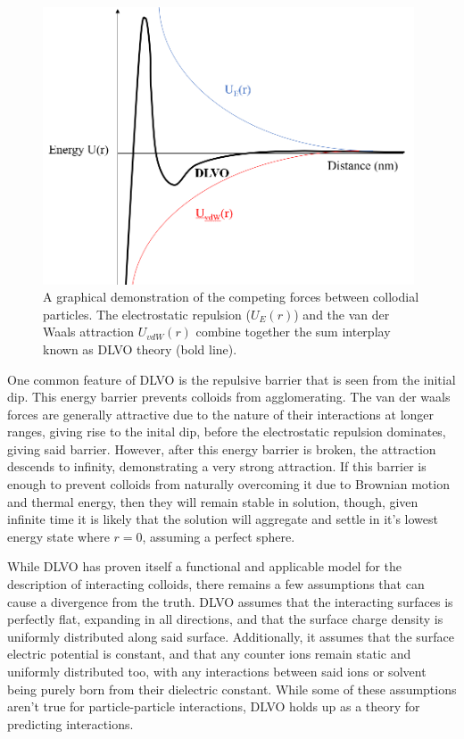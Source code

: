 \begin{figure}[h]     %
        \begin{center}
          \includegraphics[width=110mm]{chapter1/DLVO.PNG}
\end{center}
\caption{A graphical demonstration of the competing forces between collodial particles. The electrostatic repulsion ($U_E(r)$) and the van der Waals attraction $U_{vdW}(r)$ combine together the sum interplay known as DLVO theory (bold line).}
\label{fig:DLVO}                 %
\end{figure}

One common feature of DLVO is the repulsive barrier that is seen from the initial dip. This energy barrier prevents colloids from agglomerating. The van der waals forces are generally attractive due to the nature of their interactions at longer ranges, giving rise to the inital dip, before the electrostatic repulsion dominates, giving said barrier. However, after this energy barrier is broken, the attraction descends to infinity, demonstrating a very strong attraction. If this barrier is enough to prevent colloids from naturally overcoming it due to Brownian motion and thermal energy, then they will remain stable in solution, though, given infinite time it is likely that the solution will aggregate and settle in it's lowest energy state where $r = 0$, assuming a perfect sphere.\cite{?}

While DLVO has proven itself a functional and applicable model for the description of interacting colloids, there remains a few assumptions that can cause a divergence from the truth. DLVO assumes that the interacting surfaces is perfectly flat, expanding in all directions, and that the surface charge density is uniformly distributed along said surface. Additionally, it assumes that the surface electric potential is constant, and that any counter ions remain static and uniformly distributed too, with any interactions between said ions or solvent being purely born from their dielectric constant. While some of these assumptions aren't true for particle-particle interactions, DLVO holds up as a theory for predicting interactions. \cite{particledep} \cite{effectHetSurf} \cite{colloidDepKin} \cite{chemDiscCharge} \cite{DLVOreview} 

